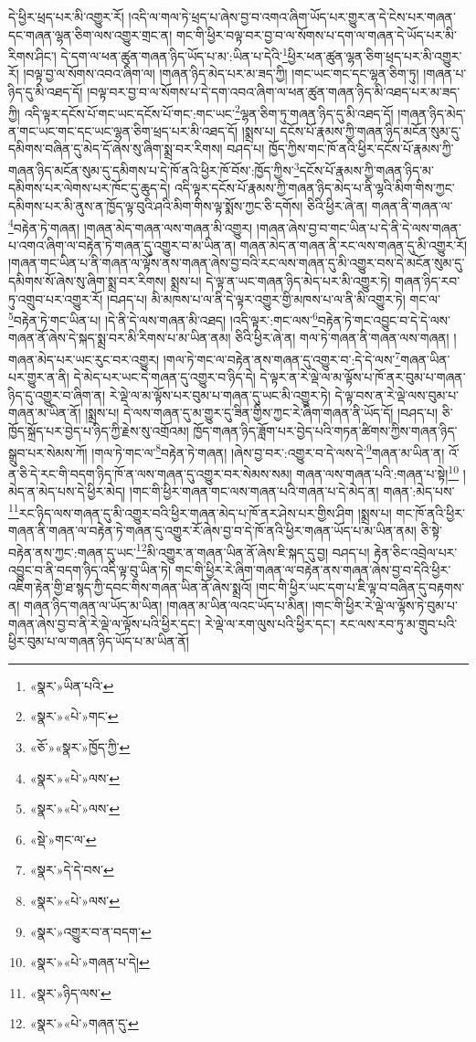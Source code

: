 དེ་ཕྱིར་ཕྲད་པར་མི་འགྱུར་རོ། །འདི་ལ་གལ་ཏེ་ཕྲད་པ་ཞེས་བྱ་བ་འགའ་ཞིག་ཡོད་པར་གྱུར་ན་དེ་ངེས་པར་གཞན་དང་གཞན་ལྷན་ཅིག་ལས་འགྱུར་གྲང་ན། གང་གི་ཕྱིར་བལྟ་བར་བྱ་བ་ལ་སོགས་པ་དག་ལ་གཞན་དེ་ཡོད་པར་མི་རིགས་ཤིང་། དེ་དག་ལ་ཕན་ཚུན་གཞན་ཉིད་ཡོད་པ་མ་:ཡིན་པ་དེའི་\footnote{«སྣར་»ཡིན་པའི་}ཕྱིར་ཕན་ཚུན་ལྷན་ཅིག་ཕྲད་པར་མི་འགྱུར་རོ། །བལྟ་བྱ་ལ་སོགས་འབའ་ཞིག་ལ། །གཞན་ཉིད་མེད་པར་མ་ཟད་ཀྱི། །གང་ཡང་གང་དང་ལྷན་ཅིག་ཏུ། །གཞན་པ་ཉིད་དུ་མི་འཐད་དོ། །བལྟ་བར་བྱ་བ་ལ་སོགས་པ་དེ་དག་འབའ་ཞིག་ལ་ཕན་ཚུན་གཞན་ཉིད་མི་འཐད་པར་མ་ཟད་ཀྱི། འདི་ལྟར་དངོས་པོ་གང་ཡང་དངོས་པོ་གང་:གང་ཡང་\footnote{«སྣར་»«པེ་»གང་}ལྷན་ཅིག་ཏུ་གཞན་ཉིད་དུ་མི་འཐད་དོ། །གཞན་ཉིད་མེད་ན་གང་ཡང་གང་དང་ཡང་ལྷན་ཅིག་ཕྲད་པར་མི་འཐད་དོ། །སྨྲས་པ། དངོས་པོ་རྣམས་ཀྱི་གཞན་ཉིད་མངོན་སུམ་དུ་དམིགས་བཞིན་དུ་མེད་དོ་ཞེས་སུ་ཞིག་སྨྲ་བར་རིགས། བཤད་པ། ཁྱོད་ཀྱིས་གང་ཁོ་ནའི་ཕྱིར་དངོས་པོ་རྣམས་ཀྱི་གཞན་ཉིད་མངོན་སུམ་དུ་དམིགས་པ་དེ་ཁོ་ནའི་ཕྱིར་ཁོ་བོས་:ཁྱོད་ཀྱིས་\footnote{«ཅོ་»«སྣར་»ཁྱོད་ཀྱི་}དངོས་པོ་རྣམས་ཀྱི་གཞན་ཉིད་མ་དམིགས་པར་ལེགས་པར་ཁོང་དུ་ཆུད་དེ། འདི་ལྟར་དངོས་པོ་རྣམས་ཀྱི་གཞན་ཉིད་མེད་པ་ནི་ལྷའི་མིག་གིས་ཀྱང་དམིགས་པར་མི་ནུས་ན་ཁྱོད་ལྟ་བུའི་ཤའི་མིག་གིས་ལྟ་སྨོས་ཀྱང་ཅི་དགོས། ཅིའི་ཕྱིར་ཞེ་ན། གཞན་ནི་གཞན་ལ་\footnote{«སྣར་»«པེ་»ལས་}བརྟེན་ཏེ་གཞན། །གཞན་མེད་གཞན་ལས་གཞན་མི་འགྱུར། །གཞན་ཞེས་བྱ་བ་གང་ཡིན་པ་དེ་ནི་དེ་ལས་གཞན་པ་འགའ་ཞིག་ལ་བརྟེན་ཏེ་གཞན་དུ་འགྱུར་བ་མ་ཡིན་ན། གཞན་མེད་ན་གཞན་ནི་རང་ལས་གཞན་དུ་མི་འགྱུར་རོ། །གཞན་གང་ཡིན་པ་ནི་གཞན་ལ་ལྟོས་ནས་གཞན་ཞེས་བྱ་བའི་རང་ལས་གཞན་དུ་མི་འགྱུར་བས་དེ་མངོན་སུམ་དུ་དམིགས་སོ་ཞེས་སུ་ཞིག་སྨྲ་བར་རིགས། སྨྲས་པ། དེ་ལྟ་ན་ཡང་གཞན་ཉིད་མེད་པར་མི་འགྱུར་ཏེ། གཞན་ཉིད་རབ་ཏུ་འགྲུབ་པར་འགྱུར་རོ། །བཤད་པ། མི་མཁས་པ་ལ་ནི་དེ་ལྟར་འགྱུར་གྱི་མཁས་པ་ལ་ནི་མི་འགྱུར་ཏེ། གང་ལ་\footnote{«སྣར་»«པེ་»ལས་}བརྟེན་ཏེ་གང་ཡིན་པ། །དེ་ནི་དེ་ལས་གཞན་མི་འཐད། །འདི་ལྟར་:གང་ལས་\footnote{«སྡེ་»གང་ལ་}བརྟེན་ཏེ་གང་འབྱུང་བ་དེ་དེ་ལས་གཞན་ནོ་ཞེས་དེ་སྐད་སྨྲ་བར་མི་རིགས་པ་མ་ཡིན་ནམ། ཅིའི་ཕྱིར་ཞེ་ན། གལ་ཏེ་གཞན་ནི་གཞན་ལས་གཞན། །གཞན་མེད་པར་ཡང་རུང་བར་འགྱུར། །གལ་ཏེ་གང་ལ་བརྟེན་ནས་གཞན་དུ་འགྱུར་བ་:དེ་དེ་ལས་\footnote{«སྣར་»དེ་དེ་བས་}གཞན་ཡིན་པར་གྱུར་ན་ནི། དེ་མེད་པར་ཡང་དེ་གཞན་དུ་འགྱུར་བ་ཉིད་དེ། དེ་ལྟར་ན་རེ་ལྡེ་ལ་མ་ལྟོས་པ་ཁོ་ནར་བུམ་པ་གཞན་ཉིད་དུ་འགྱུར་བ་ཞིག་ན། རེ་ལྡེ་ལ་མ་ལྟོས་པར་བུམ་པ་གཞན་དུ་ཡང་མི་འགྱུར་ཏེ། དེ་ལྟ་བས་ན་རེ་ལྡེ་ལས་བུམ་པ་གཞན་མ་ཡིན་ནོ། །སྨྲས་པ། དེ་ལས་གཞན་དུ་མ་གྱུར་དུ་ཟིན་གྱིས་ཀྱང་རེ་ཞིག་གཞན་ནི་ཡོད་དོ། །བཤད་པ། ཅི་ཁྱོད་སྐྲོད་པར་བྱེད་པ་ཉིད་ཀྱི་རྗེས་སུ་འགྲོའམ། ཁྱོད་གཞན་ཉིད་ཟློག་པར་བྱེད་པའི་གཏན་ཚིགས་ཀྱིས་གཞན་ཉིད་སྒྲུབ་པར་སེམས་ཀོ། །གལ་ཏེ་གང་ལ་\footnote{«སྣར་»«པེ་»ལས་}བརྟེན་ཏེ་གཞན། །ཞེས་བྱ་བར་:འགྱུར་བ་དེ་ལས་དེ་\footnote{«སྣར་»འགྱུར་བ་ན་བདག་}གཞན་མ་ཡིན་ན། འོ་ན་ཅི་དེ་རང་གི་བདག་ཉིད་ཁོ་ན་ལས་གཞན་དུ་འགྱུར་བར་སེམས་སམ། གཞན་ལས་གཞན་པའི་:གཞན་པ་སྟེ།\footnote{«སྣར་»«པེ་»གཞན་པ་དེ།} །མེད་ན་མེད་པས་དེ་ཕྱིར་མེད། །གང་གི་ཕྱིར་གཞན་གང་ལས་གཞན་པའི་གཞན་པ་དེ་མེད་ན། གཞན་:མེད་པས་\footnote{«སྣར་»ཉིད་ལས་}རང་ཉིད་ལས་གཞན་དུ་མི་འགྱུར་བའི་ཕྱིར་གཞན་མེད་པ་ཁོ་ནར་ཤེས་པར་གྱིས་ཤིག །སྨྲས་པ། གང་ཁོ་ནའི་ཕྱིར་གཞན་ནི་གཞན་ལ་བརྟེན་ཏེ་གཞན་དུ་འགྱུར་རོ་ཞེས་བྱ་བ་དེ་ཁོ་ནའི་ཕྱིར་གཞན་ཡོད་པ་མ་ཡིན་ནམ། ཅི་སྟེ་བརྟེན་ནས་ཀྱང་:གཞན་དུ་ཡང་\footnote{«སྣར་»«པེ་»གཞན་དུ་}མི་འགྱུར་ན་གཞན་ཡིན་ནོ་ཞེས་ཇི་སྐད་དུ་བྱ། བཤད་པ། རྟེན་ཅིང་འབྲེལ་པར་འབྱུང་བ་ནི་བདག་ཉིད་འདི་ལྟ་བུ་ཡིན་ཏེ། གང་གི་ཕྱིར་རེ་ཞིག་གཞན་ལ་བརྟེན་ནས་གཞན་ཞེས་བྱ་བ་དེའི་ཕྱིར་འཇིག་རྟེན་གྱི་ཐ་སྙད་ཀྱི་དབང་གིས་གཞན་ཡིན་ནོ་ཞེས་སྨྲའོ། །གང་གི་ཕྱིར་ཡང་དག་པ་ཇི་ལྟ་བ་བཞིན་དུ་བརྟགས་ན། གཞན་ཉིད་གཞན་ལ་ཡོད་མ་ཡིན། །གཞན་མ་ཡིན་ལའང་ཡོད་པ་མིན། །གང་གི་ཕྱིར་རེ་ལྡེ་ལ་ལྟོས་ཏེ་བུམ་པ་གཞན་ཞེས་བྱ་བ་ནི་རེ་ལྡེ་ལ་ལྟོས་པའི་ཕྱིར་དང་། རེ་ལྡེ་ལ་རག་ལུས་པའི་ཕྱིར་དང་། རང་ལས་རབ་ཏུ་མ་གྲུབ་པའི་ཕྱིར་བུམ་པ་ལ་གཞན་ཉིད་ཡོད་པ་མ་ཡིན་ནོ། 